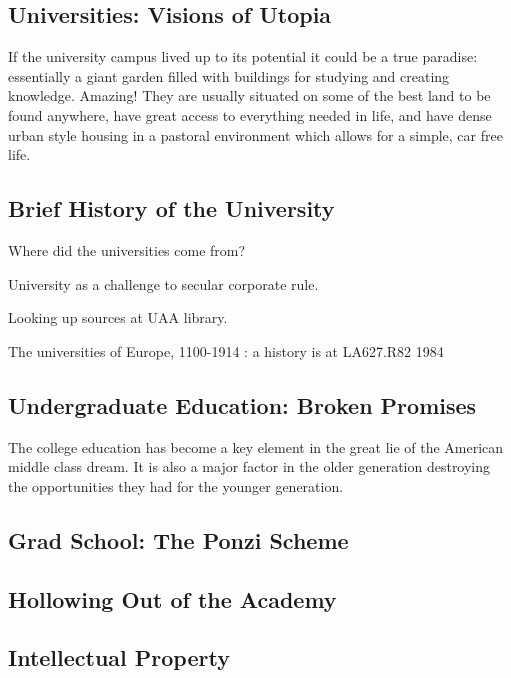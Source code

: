 \subsection{Universities: Visions of
Utopia}\label{universities-visions-of-utopia}

If the university campus lived up to its potential it could be a true
paradise: essentially a giant garden filled with buildings for studying
and creating knowledge. Amazing! They are usually situated on some of
the best land to be found anywhere, have great access to everything
needed in life, and have dense urban style housing in a pastoral
environment which allows for a simple, car free life.

\subsection{Brief History of the
University}\label{brief-history-of-the-university}

Where did the universities come from?

University as a challenge to secular corporate rule.

Looking up sources at UAA library.

The universities of Europe, 1100-1914 : a history is at LA627.R82 1984

\subsection{Undergraduate Education: Broken
Promises}\label{undergraduate-education-broken-promises}

The college education has become a key element in the great lie of the
American middle class dream. It is also a major factor in the older
generation destroying the opportunities they had for the younger
generation.

\subsection{Grad School: The Ponzi
Scheme}\label{grad-school-the-ponzi-scheme}

\subsection{Hollowing Out of the
Academy}\label{hollowing-out-of-the-academy}

\subsection{Intellectual Property}\label{intellectual-property}

